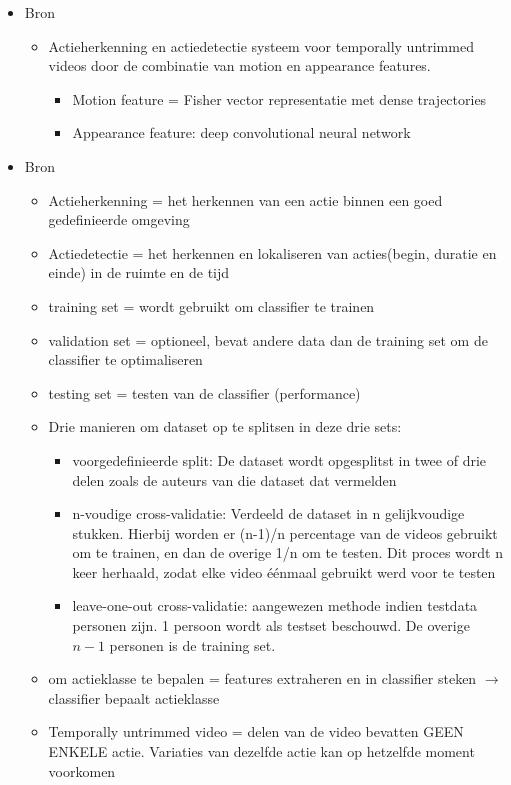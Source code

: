 \begin{itemize}
	\item Bron \cite{Wang2014}
	\begin{itemize}
		\item Actieherkenning en actiedetectie systeem voor temporally untrimmed videos door de combinatie van motion en appearance features.
		\begin{itemize}
			\item Motion feature = Fisher vector representatie met dense trajectories
			\item Appearance feature: deep convolutional neural network
		\end{itemize}
	\end{itemize}
	\item Bron \cite{Kang2016}
	\begin{itemize}
		\item Actieherkenning = het herkennen van een actie binnen een goed gedefinieerde omgeving 
		\item Actiedetectie = het herkennen en lokaliseren van acties(begin, duratie en einde) in de ruimte en de tijd
		\item training set = wordt gebruikt om classifier te trainen
		\item validation set = optioneel, bevat andere data dan de training set om de classifier te optimaliseren
		\item testing set = testen van de classifier (performance)
		\item Drie manieren om dataset op te splitsen in deze drie sets:
		\begin{itemize}
			\item voorgedefinieerde split: De dataset wordt opgesplitst  in twee of drie delen zoals de auteurs van die dataset dat vermelden
			\item n-voudige cross-validatie: Verdeeld de dataset in n gelijkvoudige stukken. Hierbij worden er (n-1)/n  percentage van de videos gebruikt om te trainen, en dan de overige 1/n om te testen. Dit proces wordt n keer herhaald, zodat elke video éénmaal gebruikt werd voor te testen
			\item leave-one-out cross-validatie: {\color{green}aangewezen methode indien testdata personen zijn.} 1 persoon wordt als testset beschouwd. De overige $n - 1$ personen is de training set.
		\end{itemize}
		
		
		\item  om actieklasse te bepalen = features extraheren en in classifier steken $\rightarrow$ classifier bepaalt actieklasse
		\item Temporally untrimmed video = delen van de video bevatten GEEN ENKELE actie. Variaties van dezelfde actie kan op hetzelfde moment voorkomen
		

\end{itemize}
\end{itemize}
